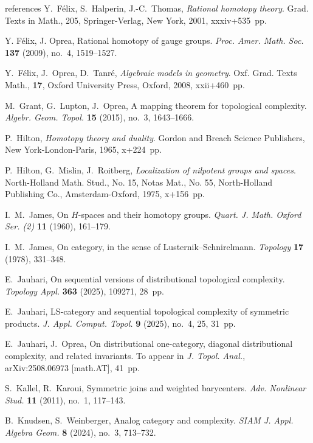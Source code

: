 \documentclass[amscd,amssymb,verbatim,10pt]{amsart}
\numberwithin{equation}{section}
\theoremstyle{plain}
\theoremstyle{definition}
\begin{document}
\begin{thebibliography}{references}
 Y.~F\'elix, S.~Halperin, J.-C.~Thomas, \emph{Rational homotopy theory}. Grad. Texts in Math., 205, Springer-Verlag, New York, 2001, xxxiv+535~pp.

 Y. F\'elix, J. Oprea, Rational homotopy of gauge groups. \emph{Proc. Amer. Math. Soc.} \textbf{137} (2009), no.~4, 1519--1527.

 Y.~F\'elix, J.~Oprea, D.~Tanr\'e, \emph{Algebraic models in geometry}. Oxf. Grad. Texts Math., \textbf{17}, Oxford University Press, Oxford, 2008, xxii+460~pp.

 M.~Grant, G.~Lupton, J.~Oprea, A mapping theorem for topological complexity. \emph{Algebr. Geom. Topol.} \textbf{15} (2015), no.~3, 1643--1666. 

 P.~Hilton, \emph{Homotopy theory and duality}. Gordon and Breach Science Publishers, New York-London-Paris, 1965, x+224~pp.

 P.~Hilton, G.~Mislin, J.~Roitberg, \emph{Localization of nilpotent groups and spaces}. North-Holland Math. Stud., No. 15, Notas Mat., No. 55, North-Holland Publishing Co., Amsterdam-Oxford, 1975, x+156~pp.

 I.~M.~James, On $H$-spaces and their homotopy groups. \emph{Quart. J. Math. Oxford Ser. (2)} \textbf{11} (1960), 161--179.

 I.~M.~James, On category, in the sense of Lusternik--Schnirelmann. \emph{Topology} \textbf{17} (1978), 331--348.

 E.~Jauhari, On sequential versions of distributional topological complexity. \emph{Topology Appl.} \textbf{363} (2025), 109271, 28~pp.

 E.~Jauhari, LS-category and sequential topological complexity of symmetric products. \emph{J. Appl. Comput. Topol.} \textbf{9} (2025), no.~4, 25, 31~pp.

 E.~Jauhari, J.~Oprea, On distributional one-category, diagonal distributional complexity, and related invariants. To appear in \emph{J. Topol. Anal.}, arXiv:2508.06973 [math.AT], 41~pp.

 S.~Kallel, R.~Karoui, Symmetric joins and weighted barycenters. \emph{Adv. Nonlinear Stud.} \textbf{11} (2011), no.~1, 117--143.

 B.~Knudsen, S.~Weinberger, Analog category and complexity. \emph{SIAM J. Appl. Algebra Geom.} \textbf{8} (2024), no.~3, 713--732.


\end{thebibliography}
\end{document}
